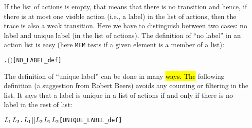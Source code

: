 If the list of actions is empty, that means that there is no transition and hence,
if there is at most one visible action (i.e., a label) in the list of actions,
then the trace is also a weak transition. Here
we have to distinguish between two cases: no label and unique label (in
the list of actions). The definition of ``no
label'' in an action list is easy (here \texttt{MEM} tests if a given element is a member of a list):
\begin{alltt}
     \HOLTokenDefEquality{} \HOLSymConst{\HOLTokenNeg{}}\HOLSymConst{\HOLTokenExists{}}.  \ensuremath{(} \ensuremath{)} \hfill{[NO_LABEL_def]}
\end{alltt}

The definition of ``unique label'' can be done in many \hl{ways. The}
following definition (a suggestion from Robert Beers)
avoids any counting or filtering in the list.
It says that a label is unique in a list of actions if and only if there is no
label in the rest of list:
\begin{alltt}
      \HOLTokenDefEquality{}
     \HOLSymConst{\HOLTokenExists{}}\ensuremath{\HOLBoundVar{L}\sb{\mathrm{1}}} \ensuremath{\HOLBoundVar{L}\sb{\mathrm{2}}}. \ensuremath{\HOLBoundVar{L}\sb{\mathrm{1}}} \HOLSymConst{\HOLTokenDoublePlus} \ensuremath{[}\ensuremath{]} \HOLSymConst{\HOLTokenDoublePlus} \ensuremath{\HOLBoundVar{L}\sb{\mathrm{2}}} \HOLSymConst{\ensuremath{=}}  \HOLSymConst{\HOLTokenConj{}}  \ensuremath{\HOLBoundVar{L}\sb{\mathrm{1}}} \HOLSymConst{\HOLTokenConj{}}  \ensuremath{\HOLBoundVar{L}\sb{\mathrm{2}}}\hfill{[UNIQUE_LABEL_def]}
\end{alltt}

